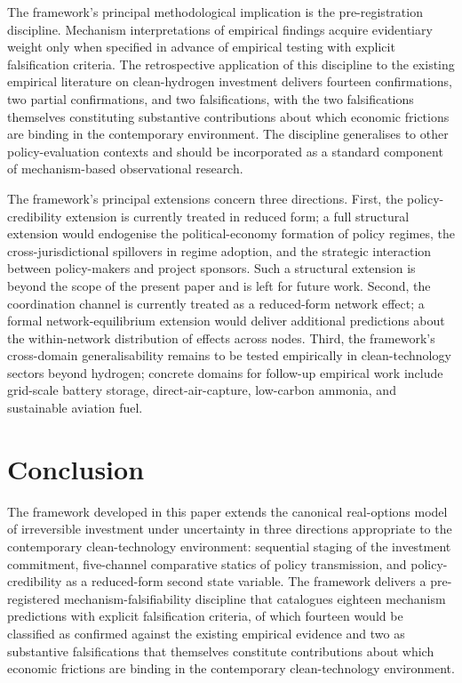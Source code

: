 \documentclass[12pt,a4paper]{article}
\theoremstyle{plain}
\theoremstyle{definition}
\begin{document}
The framework's principal methodological implication is the pre-registration discipline. Mechanism interpretations of empirical findings acquire evidentiary weight only when specified in advance of empirical testing with explicit falsification criteria. The retrospective application of this discipline to the existing empirical literature on clean-hydrogen investment delivers fourteen confirmations, two partial confirmations, and two falsifications, with the two falsifications themselves constituting substantive contributions about which economic frictions are binding in the contemporary environment. The discipline generalises to other policy-evaluation contexts and should be incorporated as a standard component of mechanism-based observational research.

The framework's principal extensions concern three directions. First, the policy-credibility extension is currently treated in reduced form; a full structural extension would endogenise the political-economy formation of policy regimes, the cross-jurisdictional spillovers in regime adoption, and the strategic interaction between policy-makers and project sponsors. Such a structural extension is beyond the scope of the present paper and is left for future work. Second, the coordination channel is currently treated as a reduced-form network effect; a formal network-equilibrium extension would deliver additional predictions about the within-network distribution of effects across nodes. Third, the framework's cross-domain generalisability remains to be tested empirically in clean-technology sectors beyond hydrogen; concrete domains for follow-up empirical work include grid-scale battery storage, direct-air-capture, low-carbon ammonia, and sustainable aviation fuel.

\section{Conclusion}
\label{sec:conclusion}

The framework developed in this paper extends the canonical real-options model of irreversible investment under uncertainty in three directions appropriate to the contemporary clean-technology environment: sequential staging of the investment commitment, five-channel comparative statics of policy transmission, and policy-credibility as a reduced-form second state variable. The framework delivers a pre-registered mechanism-falsifiability discipline that catalogues eighteen mechanism predictions with explicit falsification criteria, of which fourteen would be classified as confirmed against the existing empirical evidence and two as substantive falsifications that themselves constitute contributions about which economic frictions are binding in the contemporary clean-technology environment.
\end{document}
